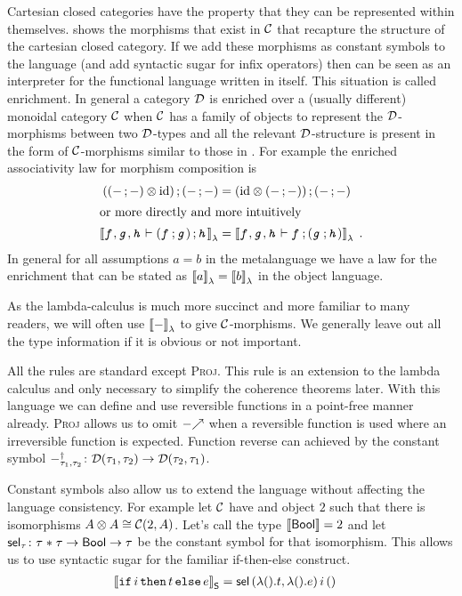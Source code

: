 \documentclass[runningheads,envcountsame]{llncs}
\begin{document}
    Cartesian closed categories have the property that they can be represented within themselves.  shows the morphisms that exist in $\mathcal{C}$ that recapture the structure of the cartesian closed category. If we add these morphisms as constant symbols to the language (and add syntactic sugar for infix operators) then  can be seen as an interpreter for the functional language written in itself. This situation is called enrichment. In general a category $\mathcal{D}$ is enriched over a (usually different) monoidal category $\mathcal{C}$ when $\mathcal{C}$ has a family of objects to represent the $\mathcal{D}$-morphisms between two $\mathcal{D}$-types and all the relevant $\mathcal{D}$-structure is present in the form of $\mathcal{C}$-morphisms similar to those in . For example the enriched associativity law for morphism composition is \begin{align*}
    \comp{(\tensor{(\comp{-}{-})}{\id})}{(\comp{-}{-})} &= 
        \comp{(\tensor{\id}{(\comp{-}{-})})}{(\comp{-}{-})} \\
    \intertext{or more directly and more intuitively}
    \semL{\evar{f}, \evar{g}, \evar{h} \vdash \comp{(\comp{\evar{f}}{\evar{g}})}{\evar{h}}} &= 
        \semL{\evar{f}, \evar{g}, \evar{h} \vdash \comp{\evar{f}}{(\comp{\evar{g}}{\evar{h}})}} \;.
    \end{align*}
    In general for all assumptions $a = b$ in the metalanguage we have a law for the enrichment that can be stated as $\semL{a} = \semL{b}$ in the object language.
    
    As the lambda-calculus is much more succinct and more familiar to many readers, we will often use $\semL{-}$ to give $\mathcal{C}$-morphisms. We generally leave out all the type information if it is obvious or not important.
    
    All the rules are standard except \textsc{Proj}. This rule is an extension to the lambda calculus and only necessary to simplify the coherence theorems later. With this language we can define and use reversible functions in a point-free manner already. \textsc{Proj} allows us to omit $\f{-}$ when a reversible function is used where an irreversible function is expected. Function reverse can achieved by the constant symbol $\rev{-}_{\tau_1, \tau_2}\colon \homD{\tau_1}{\tau_2} \to \homD{\tau_2}{\tau_1}$.
    
    Constant symbols also allow us to extend the language without affecting the language consistency. For example let $\mathcal{C}$ have and object $2$ such that there is isomorphisms $\tensor{A}{A} \cong \homC{2}{A}$. Let's call the type $\sem{\tbool} = 2$ and let $\select_\tau\colon \tfun{\tpair{\tau}{\tau}}{\tfun{\tbool}{\tau}}$ be the constant symbol for that isomorphism. This allows us to use syntactic sugar for the familiar if-then-else construct. \begin{align*}
        \sugar{\eifthenelse{i}{t}{e}} &= \eapp{\eapp{\eapp{\select}{\epair{\elam{\eunit}{t}}{\elam{\eunit}{e}}}}{i}}{\eunit}
    \end{align*}
\end{document}
